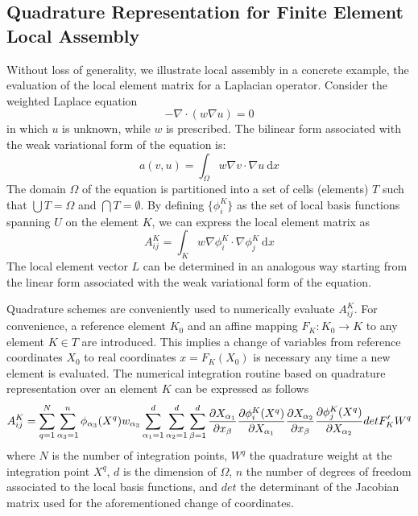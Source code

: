 \subsection{Quadrature Representation for Finite Element Local Assembly}
\label{sec:quadrature-rep}
Without loss of generality, we illustrate local assembly in a concrete example, the evaluation of the local element matrix for a Laplacian operator. Consider the weighted Laplace equation
\begin{equation}
- \nabla \cdot (w \nabla u) = 0
\end{equation}
in which $u$ is unknown, while $w$ is prescribed. The bilinear form associated with the weak variational form of the equation is:
\begin{equation}
a(v, u) = \int_\Omega w \nabla v \cdot \nabla u\ \mathrm{d}x
\end{equation}
The domain $\Omega$ of the equation is partitioned into a set of cells (elements) $T$ such that $\bigcup T = \Omega$ and $\bigcap T = \emptyset$. By defining $\lbrace \phi_i^K \rbrace$ as the set of local basis functions spanning $U$ on the element $K$, we can express the local element matrix as
\begin{equation}
\label{eq:stiffness}
A_{ij}^K = \int_K w \nabla \phi_i^K \cdot \nabla \phi_j^K\ \mathrm{d}x
\end{equation}
The local element vector $L$ can be determined in an analogous way starting from the linear form associated with the weak variational form of the equation. 

Quadrature schemes are conveniently used to numerically evaluate $A_{ij}^K$. For convenience, a reference element $K_0$ and an affine mapping $F_K : K_0 \rightarrow K$ to any element $K \in T$ are introduced. This implies a change of variables from reference coordinates $X_0$ to real coordinates $x = F_K (X_0)$ is necessary any time a new element is evaluated. The numerical integration routine based on quadrature representation over an element $K$ can be expressed as follows
\begin{equation}
\label{eq:quadrature}
\scriptsize
A_{ij}^K = \sum_{q=1}^N \sum_{\alpha_3=1}^n \phi_{\alpha_3}(X^q)w_{\alpha_3} \sum_{\alpha_1=1}^d \sum_{\alpha_2=1}^d \sum_{\beta=1}^d \frac{\partial X_{\alpha_1}}{\partial x_{\beta}} \frac{\partial \phi_i^K(X^q)}{\partial X_{\alpha_1}} \frac{\partial X_{\alpha_2}}{\partial x_{\beta}} \frac{\partial \phi_j^K(X^q)}{\partial X_{\alpha_2}} det F_K' W^q
\end{equation}
where $N$ is the number of integration points, $W^q$ the quadrature weight at the integration point $X^q$, $d$ is the dimension of $\Omega$, $n$ the number of degrees of freedom associated to the local basis functions, and $det$ the determinant of the Jacobian matrix used for the aforementioned change of coordinates.  

